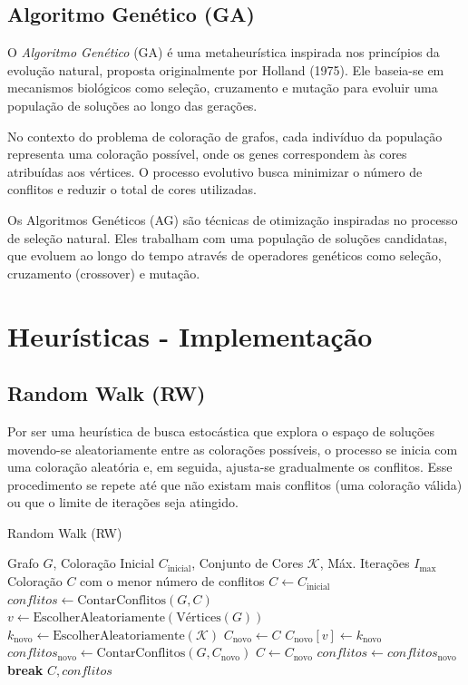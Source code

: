 \documentclass[12pt,a4paper]{article}
\begin{document}
\subsection{Algoritmo Genético (GA)}
O \textit{Algoritmo Genético} (GA) é uma metaheurística inspirada nos princípios da evolução natural, proposta originalmente por Holland (1975). Ele baseia-se em mecanismos biológicos como seleção, cruzamento e mutação para evoluir uma população de soluções ao longo das gerações.

No contexto do problema de coloração de grafos, cada indivíduo da população representa uma coloração possível, onde os genes correspondem às cores atribuídas aos vértices. O processo evolutivo busca minimizar o número de conflitos e reduzir o total de cores utilizadas.

Os Algoritmos Genéticos (AG) são técnicas de otimização inspiradas no processo de seleção natural. Eles trabalham com uma população de soluções candidatas, que evoluem ao longo do tempo através de operadores genéticos como seleção, cruzamento (crossover) e mutação.

\section{Heurísticas - Implementação}

\subsection{Random Walk (RW)}
Por ser uma heurística de busca estocástica que explora o espaço de soluções movendo-se aleatoriamente entre as colorações possíveis, o processo se inicia com uma coloração aleatória e, em seguida, ajusta-se gradualmente os conflitos. Esse procedimento se repete até que não existam mais conflitos (uma coloração válida) ou que o limite de iterações seja atingido.

\begin{algorithm}
\caption{Random Walk (RW)}
\label{alg:random_walk}
\begin{algorithmic}[1]
\REQUIRE Grafo $G$, Coloração Inicial $C_{\text{inicial}}$, Conjunto de Cores $\mathcal{K}$, Máx. Iterações $I_{\max}$
\ENSURE Coloração $C$ com o menor número de conflitos
\STATE $C \gets C_{\text{inicial}}$
\STATE $conflitos \gets \text{ContarConflitos}(G, C)$
    \STATE $v \gets \text{EscolherAleatoriamente}(\text{Vértices}(G))$
    \STATE $k_{\text{novo}} \gets \text{EscolherAleatoriamente}(\mathcal{K})$
    \STATE $C_{\text{novo}} \gets C$
    \STATE $C_{\text{novo}}[v] \gets k_{\text{novo}}$
    \STATE $conflitos_{\text{novo}} \gets \text{ContarConflitos}(G, C_{\text{novo}})$
        \STATE $C \gets C_{\text{novo}}$
        \STATE $conflitos \gets conflitos_{\text{novo}}$
            \STATE \textbf{break}
        \ENDIF
    \ENDIF
\ENDFOR
\RETURN $C, conflitos$
\end{algorithmic}
\end{algorithm}
\end{document}
